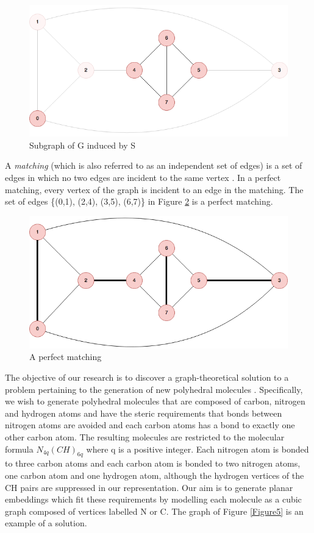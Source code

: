 \documentclass[12pt]{article}
\begin{document}
\begin{figure}[H]
    \includegraphics[scale=.4,center]{Figure3}
    \caption{Subgraph of G induced by S}
    \label{Figure3}
\end{figure}


A \textit{matching} (which is also referred to as an independent set of edges) is a set of edges in which no two edges are incident to the same vertex \cite{BM}. In a perfect matching, every vertex of the graph is incident to an edge in the matching. The set of edges \{(0,1), (2,4), (3,5), (6,7)\} in Figure \ref{Figure4} is a perfect matching. 

\begin{figure}[H]
    \includegraphics[scale=.4,center]{Figure4}
    \caption{A perfect matching}
    \label{Figure4}
\end{figure}

The objective of our research is to discover a graph-theoretical solution to a problem pertaining to the generation of new polyhedral molecules \cite{PF}. Specifically, we wish to generate polyhedral molecules that are composed of carbon, nitrogen and hydrogen atoms and have the steric requirements that bonds between nitrogen atoms are avoided and each carbon atoms has a bond to exactly one other carbon atom. The resulting molecules are restricted to the molecular formula $N_{4q}(CH)_{6q}$ where q is a positive integer. Each nitrogen atom is bonded to three carbon atoms and each carbon atom is bonded to two nitrogen atoms, one carbon atom and one hydrogen atom, although the hydrogen vertices of the CH pairs are suppressed in our representation. Our aim is to generate planar embeddings which fit these requirements by modelling each molecule as a cubic graph composed of vertices labelled N or C. The graph of Figure \ref{Figure5} is an example of a solution.
\end{document}
